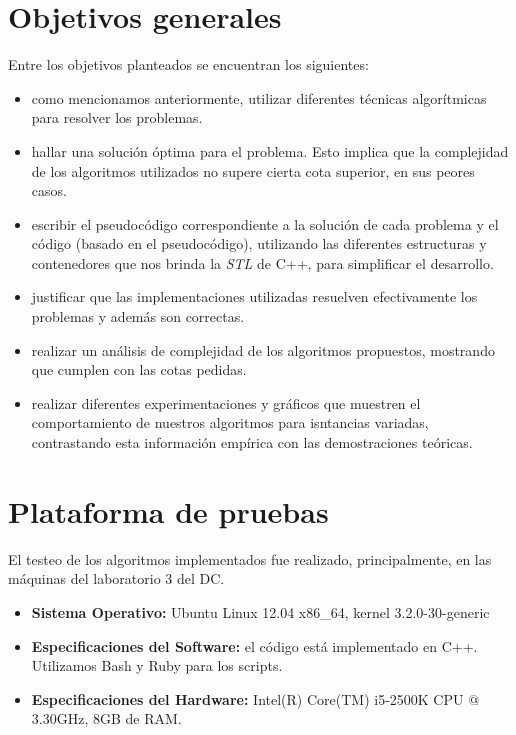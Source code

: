 \documentclass[a4paper]{article}
\begin{document}
\section{Objetivos generales}
Entre los objetivos planteados se encuentran los siguientes:
\begin{itemize}
  \item como mencionamos anteriormente, utilizar diferentes técnicas algorítmicas para
  resolver los problemas.
  
  \item hallar una solución óptima para el problema. Esto implica que la complejidad de los 
  algoritmos utilizados no supere cierta cota superior, en sus peores casos.  
  
  \item escribir el pseudocódigo correspondiente a la solución de cada problema y el código
  (basado en el pseudocódigo), utilizando las diferentes estructuras y contenedores que nos 
  brinda la \textit{STL} de C++, para simplificar el desarrollo.
  
  \item justificar que las implementaciones utilizadas resuelven efectivamente los problemas y
  además son correctas.
  
  \item realizar un análisis de complejidad de los algoritmos propuestos, mostrando que cumplen
  con las cotas pedidas.
  
  \item realizar diferentes experimentaciones y gráficos que muestren el comportamiento de nuestros
  algoritmos para isntancias variadas, contrastando esta información empírica con las demostraciones
  teóricas.
\end{itemize}

\newpage

\section{Plataforma de pruebas}
El testeo de los algoritmos implementados fue realizado, principalmente, en las máquinas del laboratorio 3 del DC. \newline
\begin{itemize}
  \item \textbf{Sistema Operativo:} Ubuntu Linux 12.04 x86_64, kernel 3.2.0-30-generic
  
  \item \textbf{Especificaciones del Software:} el código está implementado en C++. Utilizamos Bash y Ruby para los scripts.
  
  \item \textbf{Especificaciones del Hardware:} Intel(R) Core(TM) i5-2500K CPU @ 3.30GHz, 8GB de RAM.
\end{itemize}
\end{document}

